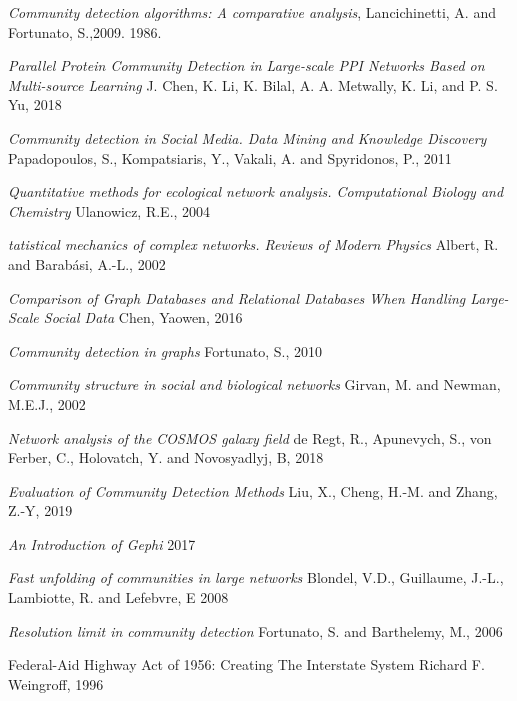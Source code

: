 \documentclass[12pt]{article}
\begin{document}
\pagebreak
\begin{thebibliography}{100}

  
    \textit{Community detection algorithms: A comparative analysis},
    Lancichinetti, A. and Fortunato, S.,2009.
    1986.
  
    \textit{Parallel Protein Community Detection in
    Large-scale PPI Networks Based on
    Multi-source Learning}
    J. Chen, K. Li, K. Bilal, A. A. Metwally, K. Li, and P. S. Yu,
    2018
    
    \textit{Community detection in Social Media. Data Mining and Knowledge Discovery}
    Papadopoulos, S., Kompatsiaris, Y., Vakali, A. and Spyridonos, P.,
    2011
    
    \textit{Quantitative methods for ecological network analysis. Computational Biology and Chemistry}
    Ulanowicz, R.E.,
    2004
    
    \textit{tatistical mechanics of complex networks. Reviews of Modern Physics}
    Albert, R. and Barabási, A.-L.,
    2002
    
    \textit{Comparison of Graph Databases and Relational Databases When Handling Large-Scale Social Data}
    Chen, Yaowen,
    2016
    
    \textit{Community detection in graphs}
    Fortunato, S.,
    2010
    
    \textit{Community structure in social and biological networks}
    Girvan, M. and Newman, M.E.J.,
    2002
    
    \textit{Network analysis of the COSMOS galaxy field}
    de Regt, R., Apunevych, S., von Ferber, C., Holovatch, Y. and Novosyadlyj, B,
    2018
    
    \textit{Evaluation of Community Detection Methods}
    Liu, X., Cheng, H.-M. and Zhang, Z.-Y,
    2019
    
    \textit{An Introduction of Gephi}
    2017

    \textit{Fast unfolding of communities in large networks}
    Blondel, V.D., Guillaume, J.-L., Lambiotte, R. and Lefebvre, E
    2008
    
    \textit{Resolution limit in community detection}
    Fortunato, S. and Barthelemy, M.,
    2006

	{Federal-Aid Highway Act of 1956: Creating The Interstate System}
	Richard F. Weingroff,
    1996
    

\end{thebibliography}
\end{document}
